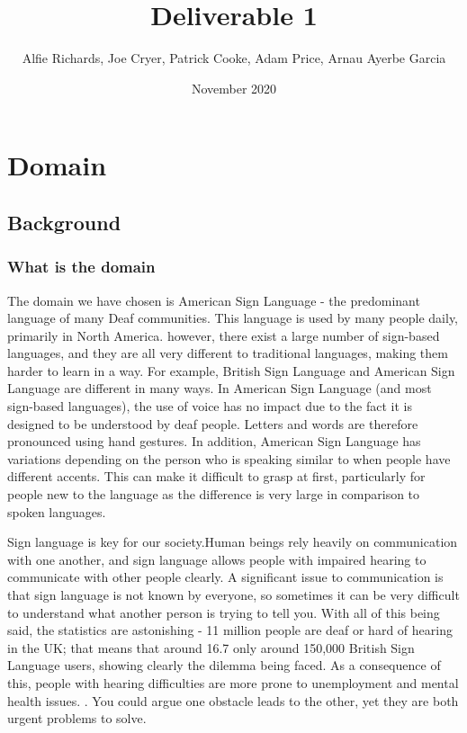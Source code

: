 \documentclass[10pt]{article}
\title{Deliverable 1}
\author{Alfie Richards, Joe Cryer, Patrick Cooke, Adam Price, Arnau Ayerbe Garcia}
\begin{document}
\date{November 2020}
\maketitle
\tableofcontents

\newpage

\section{Domain}
\subsection{Background}
\subsubsection{What is the domain}

The domain we have chosen is American Sign Language - the predominant language of many Deaf 
communities. This language is used by many people daily, primarily in North America. however, there exist a large number of 
sign-based languages, and they are all very different to traditional languages, making them harder to learn in a way. For example, 
British Sign Language and American Sign Language are different in many ways. In American Sign Language (and most sign-based languages), 
the use of voice has no impact due to the fact it is designed 
to be understood by deaf people. Letters and words are therefore pronounced using hand gestures. In addition, American Sign Language has variations depending on the person who is speaking 
similar to when people have different accents. 
\cite{national_institute_of_deafness_and_other_communication_disorders_2020} This can make it 
difficult to grasp at first, particularly for people new to the language as the difference is very large in comparison to spoken languages. 

Sign language is key for our society.Human beings rely heavily on communication with 
one another, and sign language allows people with impaired hearing to communicate with other people clearly. 
A significant issue to communication is that sign language is not known by everyone, so sometimes it 
can be very difficult to understand what another person is trying to tell you. With all of this 
being said, the statistics are astonishing - 11 million people are deaf or hard of hearing in the 
UK; that means that around 16.7%
only around 150,000 British Sign Language users, showing clearly the dilemma being faced. As a 
consequence of this, people with hearing difficulties are more prone to unemployment and mental 
health issues. \cite{gov.uk_2019}. You could argue one obstacle leads to the other, yet they are 
both urgent problems to solve.
\end{document}
